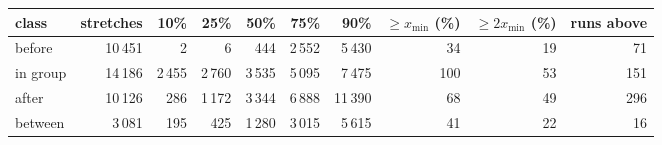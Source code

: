 \begin{tabular}{@{}l r r r r r r r r r@{}}
\toprule
class & stretches & 10\% & 25\% & 50\% & 75\% & 90\% & $\ge x_{\min}$ (\%) & $\ge 2x_{\min}$ (\%) & runs above \\
\midrule
before & 10\,451 & 2 & 6 & 444 & 2\,552 & 5\,430 & 34 & 19 & 71 \\
in group & 14\,186 & 2\,455 & 2\,760 & 3\,535 & 5\,095 & 7\,475 & 100 & 53 & 151 \\
after & 10\,126 & 286 & 1\,172 & 3\,344 & 6\,888 & 11\,390 & 68 & 49 & 296 \\
between & 3\,081 & 195 & 425 & 1\,280 & 3\,015 & 5\,615 & 41 & 22 & 16 \\
\bottomrule
\end{tabular}
